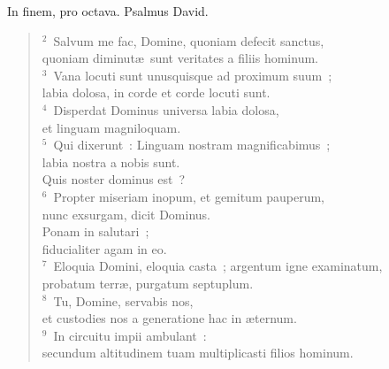 \bchapter
\lettrine[lines=3,image=true,loversize=0.05,lraise=-0.03]{I}{}n finem, pro octava. Psalmus David.
\begin{flushleft}\begin{verse}\vspace{6pt}${}^{2}$~Salvum me fac, Domine, quoniam defecit sanctus,\\ quoniam diminut\ae\ sunt veritates a filiis hominum.\\
${}^{3}$~Vana locuti sunt unusquisque ad proximum suum~;\\ labia dolosa, in corde et corde locuti sunt.\\
${}^{4}$~Disperdat Dominus universa labia dolosa,\\ et linguam magniloquam.\\
${}^{5}$~Qui dixerunt~: Linguam nostram magnificabimus~;\\ labia nostra a nobis sunt.\\ Quis noster dominus est~?\\
${}^{6}$~Propter miseriam inopum, et gemitum pauperum,\\ nunc exsurgam, dicit Dominus.\\ Ponam in salutari~;\\ fiducialiter agam in eo.\\
${}^{7}$~Eloquia Domini, eloquia casta~; argentum igne examinatum,\\ probatum terr\ae , purgatum septuplum.\\
${}^{8}$~Tu, Domine, servabis nos,\\ et custodies nos a generatione hac in \ae ternum.\\
${}^{9}$~In circuitu impii ambulant~:\\ secundum altitudinem tuam multiplicasti filios hominum.\end{verse}\end{flushleft}



